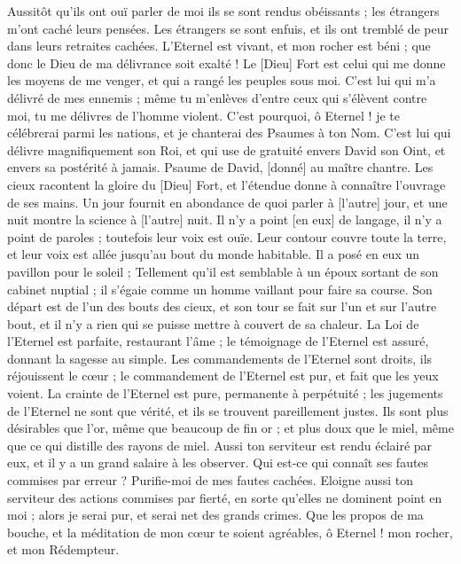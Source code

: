 \begin{multicols}{2}
Aussitôt qu'ils ont ouï parler de moi ils se sont rendus obéissants ; les étrangers m'ont caché leurs pensées.
Les étrangers se sont enfuis, et ils ont tremblé de peur dans leurs retraites cachées.
L'Eternel est vivant, et mon rocher est béni ; que donc le Dieu de ma délivrance soit exalté !
Le [Dieu] Fort est celui qui me donne les moyens de me venger, et qui a rangé les peuples sous moi.
C'est lui qui m'a délivré de mes ennemis ; même tu m'enlèves d'entre ceux qui s'élèvent contre moi, tu me délivres de l'homme violent.
C'est pourquoi, ô Eternel ! je te célébrerai parmi les nations, et je chanterai des Psaumes à ton Nom.
C'est lui qui délivre magnifiquement son Roi, et qui use de gratuité envers David son Oint, et envers sa postérité à jamais.
\VerseOne{}Psaume de David, [donné] au maître chantre. Les cieux racontent la gloire du [Dieu] Fort, et l'étendue donne à connaître l'ouvrage de ses mains.
Un jour fournit en abondance de quoi parler à [l'autre] jour, et une nuit montre la science à [l'autre] nuit.
Il n'y a point [en eux] de langage, il n'y a point de paroles ; toutefois leur voix est ouïe.
Leur contour couvre toute la terre, et leur voix est allée jusqu'au bout du monde habitable. Il a posé en eux un pavillon pour le soleil ;
Tellement qu'il est semblable à un époux sortant de son cabinet nuptial ; il s'égaie comme un homme vaillant pour faire sa course.
Son départ est de l'un des bouts des cieux, et son tour se fait sur l'un et sur l'autre bout, et il n'y a rien qui se puisse mettre à couvert de sa chaleur.
La Loi de l'Eternel est parfaite, restaurant l'âme ; le témoignage de l'Eternel est assuré, donnant la sagesse au simple.
Les commandements de l'Eternel sont droits, ils réjouissent le cœur ; le commandement de l'Eternel est pur, et fait que les yeux voient.
La crainte de l'Eternel est pure, permanente à perpétuité ; les jugements de l'Eternel ne sont que vérité, et ils se trouvent pareillement justes.
Ils sont plus désirables que l'or, même que beaucoup de fin or ; et plus doux que le miel, même que ce qui distille des rayons de miel.
Aussi ton serviteur est rendu éclairé par eux, et il y a un grand salaire à les observer.
Qui est-ce qui connaît ses fautes commises par erreur ? Purifie-moi de mes fautes cachées.
Eloigne aussi ton serviteur des actions commises par fierté, en sorte qu'elles ne dominent point en moi ; alors je serai pur, et serai net des grands crimes.
Que les propos de ma bouche, et la méditation de mon cœur te soient agréables, ô Eternel ! mon rocher, et mon Rédempteur.

\end{multicols}
